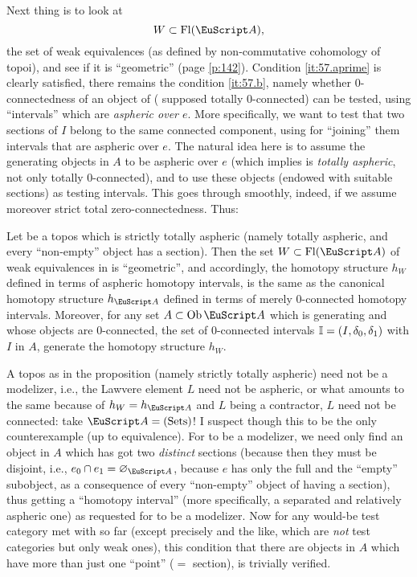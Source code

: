 Next thing is to look at
\[W\subset\Fl(\scrA),\]
the set of weak equivalences (as defined by non-commutative cohomology
of topoi), and see if it is ``geometric'' (page \ref{p:142}). Condition
\ref{it:57.aprime} is clearly satisfied, there remains the condition
\ref{it:57.b}, namely whether $0$-connectedness of an object of
\scrA{} (\scrA{} supposed totally $0$-connected) can be tested, using
``intervals'' which are \emph{aspheric over $e$}. More specifically,
we want to test that two sections of $I$ belong to the same connected
component, using for ``joining'' them intervals that are aspheric over
$e$. The natural idea here is to assume the generating objects in $A$
to be aspheric over $e$ (which implies \scrA{} is \emph{totally
  aspheric}, not only totally $0$-connected), and to use these objects
(endowed with suitable sections) as testing intervals. This goes
through smoothly, indeed, if we assume moreover strict total
zero-connectedness. Thus:
\begin{proposition}
  Let \scrA{} be a topos which is strictly totally aspheric
  \textup(namely totally aspheric, and every ``non-empty'' object has
  a section\textup). Then the set $W\subset\Fl(\scrA)$ of weak
  equivalences in \scrA{} is ``geometric'', and accordingly, the
  homotopy structure $h_W$ defined in terms of aspheric homotopy
  intervals, is the same as the canonical homotopy structure $h_\scrA$
  defined in terms of merely $0$-connected homotopy
  intervals. Moreover, for any set $A\subset\Ob\scrA$ which is
  generating and whose objects are $0$-connected, the set of
  $0$-connected intervals ${\mathbb{I}}=(I,\delta_0,\delta_1)$ with $I$ in $A$\kern1pt,
  generate the homotopy structure $h_W$.
\end{proposition}

A topos \scrA{} as in the proposition (namely strictly
totally aspheric) need not be a modelizer, i.e., the Lawvere element
$L$ need not be aspheric, or what amounts to the same because of
$h_W=h_\scrA$ and $L$ being a contractor, $L$ need not be connected:
take $\scrA=\Sets$! I suspect though this to be the only
counterexample (up to equivalence). For \scrA{} to be a modelizer, we
need only find an object in $A$ which has got two \emph{distinct}
sections (because then they must be disjoint, i.e., $e_0\sand
e_1=\varnothing_\scrA$, because $e$ has only the full and the ``empty''
subobject, as a consequence of every ``non-empty'' object of \scrA{}
having a section), thus getting a ``homotopy interval'' (more
specifically, a separated and relatively aspheric one) as requested
for \scrA{} to be a modelizer. Now for any would-be test category met
with so far (except precisely \Simplexf{} and the like, which are
\emph{not} test categories but only weak ones), this condition that
there are objects in $A$ which have more than just one ``point'' ($=$
section), is trivially verified.

